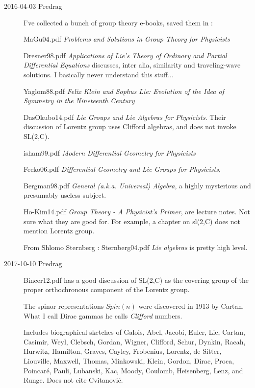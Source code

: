 \begin{description}
\item[2016-04-03 Predrag] I've collected a bunch of group theory e-books,
saved them in :

MaGu04.pdf
{\em Problems and Solutions in Group Theory for Physicists}

Dresner98.pdf
{\em Applications of Lie's Theory of Ordinary and Partial Differential Equations}
discusses, inter alia, similarity and traveling-wave solutions.
I basically never understand this stuff...

Yaglom88.pdf {\em Felix Klein and Sophus Lie: Evolution of the
Idea of Symmetry in the Nineteenth Century}

DasOkubo14.pdf
{\em Lie Groups and Lie Algebras for Physicists}.
Their discussion of Lorentz group uses
Clifford algebras, and does not invoke SL(2,C).

isham99.pdf
{\em Modern Differential Geometry for Physicists}

Fecko06.pdf
{\em Differential Geometry and Lie Groups for Physicists},

Bergman98.pdf
{\em General (a.k.a. Universal) Algebra},
a highly mysterious and presumably useless subject.

{Ho-Kim14.pdf} {\em  Group Theory - A Physicist's Primer}, are lecture
notes. Not sure what they are good for. For example, a chapter on sl(2,C)
does not mention Lorentz group.

From Shlomo Sternberg
:
Sternberg04.pdf {\em Lie algebras} is pretty high level.

\item[2017-10-10  Predrag]
Bincer12.pdf has a good discussion of SL(2,C) as the covering
group of the proper orthochronous component  of the Lorentz group.

The spinor representations $Spin(n)$ were discovered in 1913
by Cartan. What I call Dirac gammas he calls \emph{Clifford} numbers.

Includes biographical sketches of
Galois, Abel, Jacobi, Euler, Lie, Cartan,
Casimir, Weyl, Clebsch, Gordan, Wigner,
Clifford, Schur,
Dynkin, Racah,
Hurwitz, Hamilton, Graves, Cayley, Frobenius,
Lorentz, de Sitter, Liouville, Maxwell, Thomas,
Minkowski, Klein, Gordon, Dirac, Proca,
Poincar\'e, Pauli, Lubanski, Kac, Moody,
Coulomb, Heisenberg, Lenz, and Runge. Does not cite Cvitanovi\'c.


\end{description}
